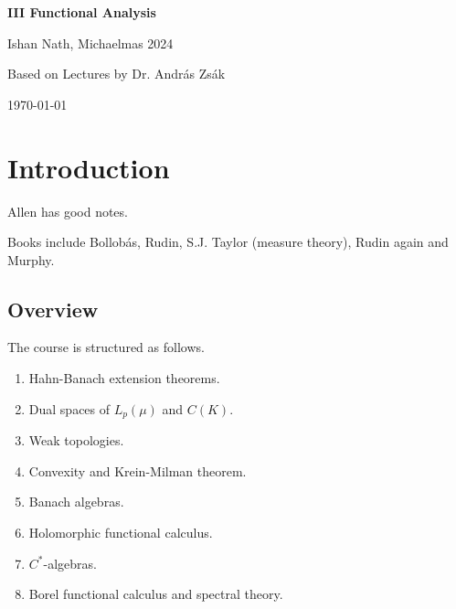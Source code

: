 \documentclass[12pt]{article}
\begin{document}
\hypersetup{pageanchor=false}
\begin{titlepage}
	\begin{center}
		\vspace*{1em}
		\Huge
		\textbf{III Functional Analysis}

		\vspace{1em}
		\large
		Ishan Nath, Michaelmas 2024

		\vspace{1.5em}

		\Large

		Based on Lectures by Dr. Andr\'as Zs\'ak

		\vspace{1em}

		\large
		\today
	\end{center}
	
\end{titlepage}
\hypersetup{pageanchor=true}

\tableofcontents

\newpage


\setcounter{section}{-1}

\section{Introduction}%
\label{sec:intro}

Allen has good notes.

Books include Bollob\'as, Rudin, S.J. Taylor (measure theory), Rudin again and Murphy.

\subsection{Overview}%
\label{sub:over}

The course is structured as follows.
\begin{enumerate}[label=Chapter \arabic*.]
	\item Hahn-Banach extension theorems.
	\item Dual spaces of $L_p(\mu)$ and $C(K)$.
	\item Weak topologies.
	\item Convexity and Krein-Milman theorem.
	\item Banach algebras.
	\item Holomorphic functional calculus.
	\item $C^\ast$-algebras.
	\item Borel functional calculus and spectral theory.
\end{enumerate}
\end{document}
